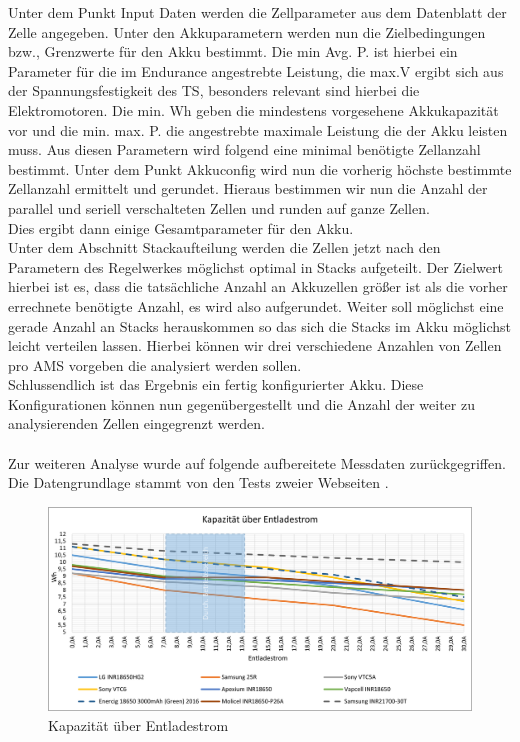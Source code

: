 Unter dem Punkt Input Daten werden die Zellparameter aus dem Datenblatt der Zelle angegeben. Unter den Akkuparametern werden nun die Zielbedingungen bzw., Grenzwerte für den Akku bestimmt. Die min Avg. P. ist hierbei ein Parameter für die im Endurance angestrebte Leistung, die max.V ergibt sich aus der Spannungsfestigkeit des \ac{TS}, besonders relevant sind hierbei die Elektromotoren. Die min. Wh geben die mindestens vorgesehene Akkukapazität vor und die min. max. P. die angestrebte maximale Leistung die der Akku leisten muss. Aus diesen Parametern wird folgend eine minimal benötigte Zellanzahl bestimmt. Unter dem Punkt Akkuconfig wird nun die vorherig höchste bestimmte Zellanzahl ermittelt und gerundet. Hieraus bestimmen wir nun die Anzahl der parallel und seriell verschalteten Zellen und runden auf ganze Zellen.\\
Dies ergibt dann einige Gesamtparameter für den Akku.\\
Unter dem Abschnitt Stackaufteilung werden die Zellen jetzt nach den Parametern des Regelwerkes möglichst optimal in Stacks aufgeteilt. Der Zielwert hierbei ist es, dass die tatsächliche Anzahl an Akkuzellen größer ist als die vorher errechnete benötigte Anzahl, es wird also aufgerundet. Weiter soll möglichst eine gerade Anzahl an Stacks herauskommen so das sich die Stacks im Akku möglichst leicht verteilen lassen. Hierbei können wir drei verschiedene Anzahlen von Zellen pro \ac{AMS} vorgeben die analysiert werden sollen.\\
Schlussendlich ist das Ergebnis ein fertig konfigurierter Akku. Diese Konfigurationen können nun gegenübergestellt und die Anzahl der weiter zu analysierenden Zellen eingegrenzt werden.\\
\\
Zur weiteren Analyse wurde auf folgende aufbereitete Messdaten zurückgegriffen. Die Datengrundlage stammt von den Tests zweier Webseiten \cite{dampfakkusVTC6,lygteVTC6}.

\begin{figure}[h]
	\centering
	\includegraphics[width=0.6\linewidth]{bilder/Kapazitaet_ueber_Entladestrom}
	\caption{Kapazität über Entladestrom}
	\label{fig:Kapazitaet_ueber_Entladestrom}
\end{figure}

